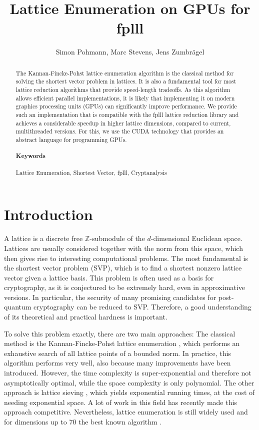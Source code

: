 \documentclass{scrartcl}
\title{Lattice Enumeration on GPUs for fplll}
\author{Simon Pohmann, Marc Stevens, Jens Zumbrägel}
\newcommand{\Z}{\mathbb{Z}}
\begin{document}
    \maketitle
    
    \begin{abstract}
    The Kannan-Fincke-Pohst lattice enumeration algorithm is the classical method for solving the shortest vector problem in lattices. It is also a fundamental tool for most lattice reduction algorithms that provide speed-length tradeoffs. 
    As this algorithm allows efficient parallel implementations, it is likely that implementing it on modern graphics processing units (GPUs) can significantly improve performance. 
    We provide such an implementation that is compatible with the fplll lattice reduction library \cite{fplll} and achieves a considerable speedup in higher lattice dimensions, compared to current, multithreaded versions.
    For this, we use the CUDA technology that provides an abstract language for programming GPUs.
    
    \paragraph{Keywords} Lattice Enumeration, Shortest Vector, fplll, Cryptanalysis
    \end{abstract}

    \section{Introduction}

    A lattice is a discrete free $\Z$-submodule of the $d$-dimensional Euclidean space. Lattices are usually considered together with the norm from this space, which then gives rise to interesting computational problems.
    The most fundamental is the shortest vector problem (SVP), which is to find a shortest nonzero lattice vector given a lattice basis. 
    This problem is often used as a basis for cryptography, as it is conjectured to be extremely hard, even in approximative versions.
    In particular, the security of many promising candidates for post-quantum cryptography can be reduced to SVP. 
    Therefore, a good understanding of its theoretical and practical hardness is important.

    To solve this problem exactly, there are two main approaches:
    The classical method is the Kannan-Fincke-Pohst lattice enumeration \cite{enum1, enum}, which performs an exhaustive search of all lattice points of a bounded norm. 
    In practice, this algorithm performs very well, also because many improvements have been introduced.
    However, the time complexity is super-exponential and therefore not asymptotically optimal, while the space complexity is only polynomial.
    The other approach is lattice sieving \cite{sieve}, which yields exponential running times, at the cost of needing exponential space. 
    A lot of work in this field has recently made this approach competitive.
    Nevertheless, lattice enumeration is still widely used and for dimensions up to 70 the best known algorithm \cite{g6k}.
\end{document}
